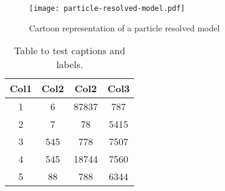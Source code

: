 \begin{figure}[h]
	\centering
	\texttt{[image: particle-resolved-model.pdf]}
	\caption{Cartoon representation of a particle resolved model}
	\label{fig:test}
\end{figure}

\begin{table}[h!]
\centering
\begin{tabular}{||c c c c||} 
 \hline
 Col1 & Col2 & Col2 & Col3 \\ [0.5ex] 
 \hline\hline
 1 & 6 & 87837 & 787 \\ 
 2 & 7 & 78 & 5415 \\
 3 & 545 & 778 & 7507 \\
 4 & 545 & 18744 & 7560 \\
 5 & 88 & 788 & 6344 \\ [1ex] 
 \hline
\end{tabular}
\caption{Table to test captions and labels.}
\label{table:1}
\end{table}
